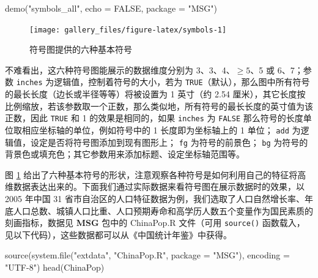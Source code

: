 \documentclass[
  b5paper,
  UTF8,twoside]{book}
\newenvironment{Shaded}{\begin{snugshade}}{\end{snugshade}}
\newcommand{\AttributeTok}[1]{\textcolor[rgb]{0.77,0.63,0.00}{#1}}
\newcommand{\ConstantTok}[1]{\textcolor[rgb]{0.00,0.00,0.00}{#1}}
\newcommand{\FunctionTok}[1]{\textcolor[rgb]{0.00,0.00,0.00}{#1}}
\newcommand{\NormalTok}[1]{#1}
\newcommand{\StringTok}[1]{\textcolor[rgb]{0.31,0.60,0.02}{#1}}
\begin{document}
\begin{Shaded}
\begin{Highlighting}[]
\FunctionTok{demo}\NormalTok{(}\StringTok{"symbols\_all"}\NormalTok{, }\AttributeTok{echo =} \ConstantTok{FALSE}\NormalTok{, }\AttributeTok{package =} \StringTok{"MSG"}\NormalTok{)}
\end{Highlighting}
\end{Shaded}

\begin{figure}

{\centering \texttt{[image: gallery\_files/figure-latex/symbols-1]} 

}

\caption[符号图提供的六种基本符号]{符号图提供的六种基本符号}\label{fig:symbols}
\end{figure}

不难看出，这六种符号图能展示的数据维度分别为 3、3、4、\(\geq5\)、5 或 6、7；参数 \texttt{inches} 为逻辑值，控制着符号的大小，若为 \texttt{TRUE}（默认），那么图中所有符号的最长长度（边长或半径等等）将被设置为 1 英寸（约 2.54 厘米），其它长度按比例缩放，若该参数取一个正数，那么类似地，所有符号的最长长度的英寸值为该正数，因此 \texttt{TRUE} 和 1 的效果是相同的，如果 \texttt{inches} 为 \texttt{FALSE} 那么符号的长度单位取相应坐标轴的单位，例如符号中的 1 长度即为坐标轴上的 1 单位； \texttt{add} 为逻辑值，设定是否将符号图添加到现有图形上； \texttt{fg} 为符号的前景色； \texttt{bg} 为符号的背景色或填充色；其它参数用来添加标题、设定坐标轴范围等。

图 \ref{fig:symbols}
给出了六种基本符号的形状，注意观察各种符号是如何利用自己的特征将高维数据表达出来的。下面我们通过实际数据来看符号图在展示数据时的效果，以 2005 年中国 31 省市自治区的人口特征数据为例，我们选取了人口自然增长率、年底人口总数、城镇人口比重、人口预期寿命和高学历人数五个变量作为国民素质的刻画指标，数据见 \textbf{MSG} 包中的 ChinaPop.R 文件（可用 \texttt{source()} 函数载入，见以下代码），这些数据都可以从《中国统计年鉴》中获得。

\begin{Shaded}
\begin{Highlighting}[]
\FunctionTok{source}\NormalTok{(}\FunctionTok{system.file}\NormalTok{(}\StringTok{"extdata"}\NormalTok{, }\StringTok{"ChinaPop.R"}\NormalTok{, }\AttributeTok{package =} \StringTok{"MSG"}\NormalTok{), }\AttributeTok{encoding =} \StringTok{"UTF{-}8"}\NormalTok{)}
\FunctionTok{head}\NormalTok{(ChinaPop)}
\end{Highlighting}
\end{Shaded}
\end{document}
